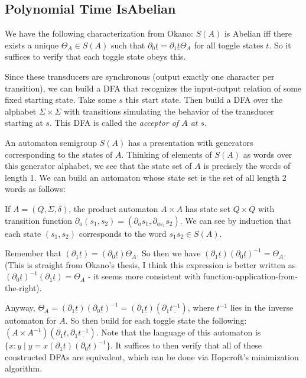 \documentclass[11pt]{article}
\begin{document}

\subsection{Polynomial Time IsAbelian}

{\color{TODO}
We have the following characterization from Okano: $S(A)$ is Abelian
iff there exists a unique $\Theta_A \in S(A)$ such that
$\partial_0 \underline{t} = \partial_1 \underline{t} \Theta_A$ for all
toggle states $t$. So it suffices to verify that each toggle state
obeys this.

Since these transducers are synchronous (output exactly one character
per transition), we can build a DFA that recognizes the input-output
relation of some fixed starting state. Take some $s$ this start
state. Then build a DFA over the alphabet $\Sigma \times \Sigma$ with
transitions simulating the behavior of the transducer starting at
$s$. This DFA is called the \textit{acceptor of $A$ at $s$}.

An automaton semigroup $S(A)$ has a presentation with generators
corresponding to the states of $A$. Thinking of elements of $S(A)$ as
words over this generator alphabet, we see that the state set of $A$
is precisely the words of length 1. We can build an automaton whose
state set is the set of all length 2 words as follows:

If $A = (Q, \Sigma, \delta)$, the product automaton $A \times A$ has
state set $Q\times Q$ with transition function
$\partial_a (s_1, s_2) = (\partial_a s_1, \partial_{a s_1} s_2)$. We
can see by induction that each state $(s_1, s_2)$ corresponds to the
word $s_1 s_2 \in S(A)$.

Remember that
$(\partial_1 \underline{t}) = (\partial_0 \underline{t})\Theta_A$. So
then we have
$(\partial_1 \underline{t})(\partial_0 \underline{t})^{-1} =
\Theta_A$. (This is straight from Okano's thesis, I think this
expression is better written as
$(\partial_0 \underline{t})^{-1}(\partial_1 \underline{t})= \Theta_A$
- it seems more consistent with function-application-from-the-right).

Anyway, $\Theta_A = (\partial_1 \underline{t})(\partial_0 \underline{t})^{-1} = (\partial_1 \underline{t})(\partial_1 \underline{t^{-1}})$, where $t^{-1}$ lies in the inverse automaton for $A$. So then build for each toggle state the following: $(A\times A^{-1})(\partial_1 \underline{t}, \partial_1 \underline{t^{-1}})$. Note that the language of this automaton is $\{ x : y \mid y = x(\partial_1 \underline{t})(\partial_0 \underline{t})^{-1}\}$. It suffices to then verify that all of these constructed DFAs are equivalent, which can be done via Hopcroft's minimization algorithm.

}
\end{document}

